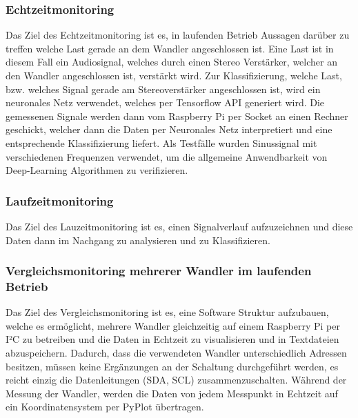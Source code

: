 \subsubsection{Echtzeitmonitoring}
Das Ziel des Echtzeitmonitoring ist es, in laufenden Betrieb Aussagen darüber zu treffen welche Last gerade an dem Wandler angeschlossen ist. Eine Last ist in diesem Fall ein Audiosignal, welches durch einen Stereo Verstärker, welcher an den Wandler angeschlossen ist, verstärkt wird.  Zur Klassifizierung, welche Last, bzw. welches Signal gerade am Stereoverstärker angeschlossen ist, wird ein neuronales Netz verwendet, welches per Tensorflow API generiert wird. Die gemessenen Signale werden dann vom Raspberry Pi per Socket an einen Rechner geschickt, welcher dann die Daten per Neuronales Netz interpretiert und eine entsprechende Klassifizierung liefert. Als Testfälle wurden Sinussignal mit verschiedenen Frequenzen verwendet, um die allgemeine Anwendbarkeit von Deep-Learning Algorithmen zu verifizieren. 




\subsubsection{Laufzeitmonitoring}

Das Ziel des Lauzeitmonitoring ist es, einen Signalverlauf aufzuzeichnen und diese Daten dann im Nachgang zu analysieren und zu Klassifizieren. 

\subsubsection{Vergleichsmonitoring mehrerer Wandler im laufenden Betrieb}

Das Ziel des Vergleichsmonitoring ist es, eine Software Struktur aufzubauen, welche es ermöglicht, mehrere Wandler gleichzeitig auf einem Raspberry Pi per I²C zu betreiben und die Daten in Echtzeit zu visualisieren und in Textdateien abzuspeichern. Dadurch, dass die verwendeten Wandler unterschiedlich Adressen besitzen, müssen keine Ergänzungen an der Schaltung durchgeführt werden, es reicht einzig die Datenleitungen (SDA, SCL) zusammenzuschalten. Während der Messung der Wandler, werden die Daten von jedem Messpunkt in Echtzeit auf ein Koordinatensystem per PyPlot übertragen. 


